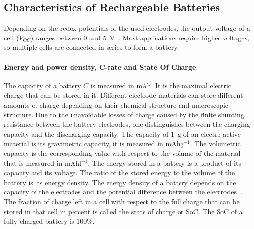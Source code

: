 \subsection{Characteristics of Rechargeable Batteries}
Depending on the redox potentials of the used electrodes, the output voltage of a cell ($V_{OC}$) ranges between 0 and 5~V~\cite{janoschka2012_advmater}. Most applications require higher voltages, so multiple cells are connected in series to form a battery.%

\paragraph{Energy and power density, C-rate and State Of Charge}
The capacity of a battery $C$ is measured in mAh. It is the maximal electric charge that can be stored in it. Different electrode materials can store different amounts of charge depending on their chemical structure and macroscopic structure. Due to the unavoidable losses of charge caused by the finite shunting resistance between the battery electrodes, one distinguishes between the charging capacity and the discharging capacity. The capacity of 1~g of an electro-active material is its gravimetric capacity, it is measured in mAhg$^{-1}$. The volumetric capacity is the corresponding value with respect to the volume of the material that is measured in mAhl$^{-1}$. The energy stored in a battery is a product of its capacity and its voltage. The ratio of the stored energy to the volume of the battery is its energy density. The energy density of a battery depends on the capacity of the electrodes and the potential difference between the electrodes~\cite{Liu2016}. The fraction of charge left in a cell with respect to the full charge that can be stored in that cell in percent is called the state of charge or SoC. The SoC of a fully charged battery is 100\%.\\
\par
